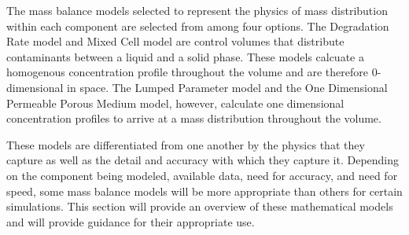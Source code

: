 The mass balance models selected to represent the physics of mass distribution
within each component are selected from among four options. The Degradation Rate
model and Mixed Cell model are control volumes that distribute contaminants
between a liquid and a solid phase. These models calcuate a homogenous
concentration profile throughout the volume and are therefore
0-dimensional in space. The Lumped Parameter model and the One Dimensional
Permeable Porous Medium model, however, calculate one dimensional concentration
profiles to arrive at a mass distribution throughout the volume.

These models are differentiated from one another by the physics that they
capture as well as the detail and accuracy with which they capture it.
Depending on the component being modeled, available data, need for
accuracy, and need for speed, some mass balance models will be more appropriate
than others for certain simulations. This section will provide an overview of
these mathematical models and will provide guidance for their appropriate use.
